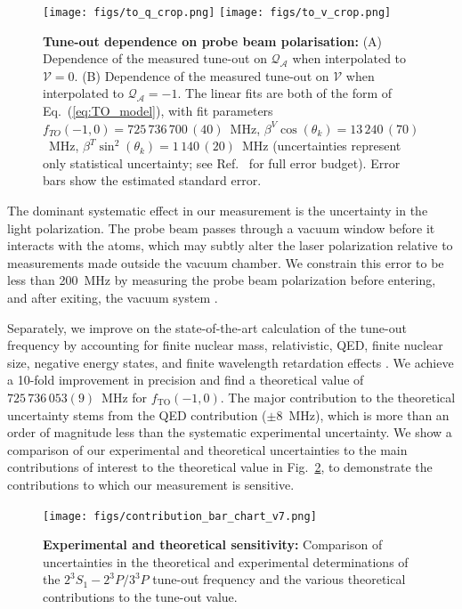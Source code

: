 \documentclass[12pt]{article}
\newcommand{\MetastableState}{2^{3\!}S_1}%
\newcommand{\UpperStateManifold}{3^{3\!}P}%
\newcommand{\LowerStateManifold}{2^{3\!}P}%
\newcommand{\TO}{\MetastableState- \LowerStateManifold / \UpperStateManifold}%
\begin{document}
\begin{figure}
\centering
\texttt{[image: figs/to\_q\_crop.png]}
\texttt{[image: figs/to\_v\_crop.png]}
\caption{\textbf{Tune-out dependence on probe beam polarisation:}
(A) Dependence of the measured tune-out on $\mathcal{Q_{A}}$ when interpolated to $\mathcal{V}=0$. (B) Dependence of the measured tune-out on $\mathcal{V}$ when interpolated to $\mathcal{Q_{A}}=-1$. The linear fits are both of the form of Eq.~(\ref{eq:TO_model}), with fit parameters \(f_{TO}(-1,0)=725\,736\,700\,(40)\)~MHz, \(\beta^V \cos(\theta_k)=13\,240\,(70)\)~MHz, \(\beta^T \sin^2(\theta_k)=1\,140\,(20)\)~MHz (uncertainties represent only statistical uncertainty; see Ref.~\cite{SOMs} for full error budget). Error bars show the estimated standard error.
} 
\label{fig:pol_TO} 
\end{figure}


The dominant systematic effect in our measurement is the uncertainty in the light polarization. The probe beam passes through a vacuum window before it interacts with the atoms, which may subtly alter the laser polarization relative to measurements made outside the vacuum chamber.
We constrain this error to be less than 200~MHz by measuring the probe beam polarization before entering, and after exiting, the vacuum system \cite{SOMs}. 


Separately, we improve on the state-of-the-art calculation \cite{PhysRevA.99.040502} of the tune-out frequency by accounting for finite nuclear mass, relativistic, QED, finite nuclear size, negative energy states, and finite wavelength retardation effects \cite{Drake2019, PhysRevA.99.041803,SOMs}. 
We achieve a 10-fold improvement in precision and find a theoretical value of \(725\,736\,053(9)\)~MHz for \(f_{\mathrm{TO}}(-1,0)\). The major contribution to the theoretical uncertainty stems from the QED contribution (\(\pm 8\)~MHz), which is more than an order of magnitude less than the systematic experimental uncertainty.
We show a comparison of our experimental and theoretical uncertainties to the main contributions of interest to the theoretical value in Fig.~\ref{fig:contributions}, to demonstrate the contributions to which our measurement is sensitive.


\begin{figure}[t]
    \centering
    \texttt{[image: figs/contribution\_bar\_chart\_v7.png]}
    \caption{\textbf{Experimental and theoretical sensitivity:} Comparison of uncertainties in the theoretical and experimental determinations of the \(\TO\) tune-out frequency and the various theoretical contributions to the tune-out value.}
    \label{fig:contributions}
\end{figure}
\end{document}
